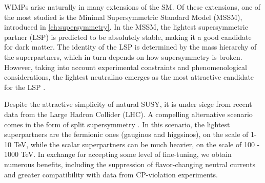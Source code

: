 
WIMPs arise naturally in many extensions of the SM. Of these extensions, one of the most studied is the Minimal Supersymmetric Standard Model (MSSM), introduced in \autoref{ch:supersymmetry}. In the MSSM, the lightest supersymmetric partner (LSP) is predicted to be absolutely stable, making it a good candidate for dark matter. The identity of the LSP is determined by the mass hierarchy of the superpartners, which in turn depends on how supersymmetry is broken. However, taking into account experimental constraints and phenomenological considerations, the lightest neutralino emerges as the most attractive candidate for the LSP \citep{Bertone2005a}. 

Despite the attractive simplicity of natural SUSY, it is under siege from recent  data from the Large Hadron Collider (LHC). A compelling alternative scenario comes in the form of split supersymmetry  \citep{Wells:2003tf, Dimopoulos2004, Giudice2005}. In this scenario, the lightest superpartners are the fermionic ones (gauginos and higgsinos), on the scale of 1-10 TeV, while the scalar superpartners can be much heavier, on the scale of 100 - 1000 TeV. In exchange for accepting some level of fine-tuning, we obtain numerous benefits, including the suppression of flavor-changing neutral currents and greater compatibility with data from CP-violation experiments.


